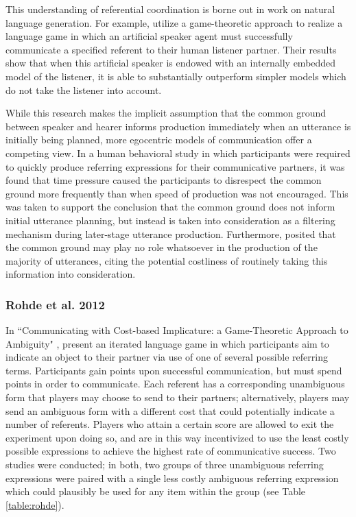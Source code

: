 \documentclass[11pt]{article}
\begin{document}
This understanding of referential coordination is borne out in work on natural language generation. For example, \cite{golland2010} utilize a game-theoretic approach to realize a language game in which an artificial speaker agent must successfully communicate a specified referent to their human listener partner. Their results show that when this artificial speaker is endowed with an internally embedded model of the listener, it is able to substantially outperform simpler models which do not take the listener into account.

While this research makes the implicit assumption that the common ground between speaker and hearer informs production immediately when an utterance is initially being planned, more egocentric models of communication offer a competing view. In a human behavioral study \citep{horton1996} in which participants were required to quickly produce referring expressions for their communicative partners, it was found that time pressure caused the participants to disrespect the common ground more frequently than when speed of production was not encouraged. This was taken to support the conclusion that the common ground does not inform initial utterance planning, but instead is taken into consideration as a filtering mechanism during later-stage utterance production. Furthermore, \cite{horton1996} posited that the common ground may play no role whatsoever in the production of the majority of utterances, citing the potential costliness of routinely taking this information into consideration.

\subsubsection{Rohde et al. 2012}
In ``Communicating with Cost-based Implicature: a Game-Theoretic Approach to Ambiguity" \citeyearpar{rohde2012}, \citeauthor{rohde2012} present an iterated language game in which participants aim to indicate an object to their partner via use of one of several possible referring terms. Participants gain points upon successful communication, but must spend points in order to communicate. Each referent has a corresponding unambiguous form that players may choose to send to their partners; alternatively, players may send an ambiguous form with a different cost that could potentially indicate a number of referents. Players who attain a certain score are allowed to exit the experiment upon doing so, and are in this way incentivized to use the least costly possible expressions to achieve the highest rate of communicative success. Two studies were conducted; in both, two groups of three unambiguous referring expressions were paired with a single less costly ambiguous referring expression which could plausibly be used for any item within the group (see Table \ref{table:rohde}). 
\end{document}
